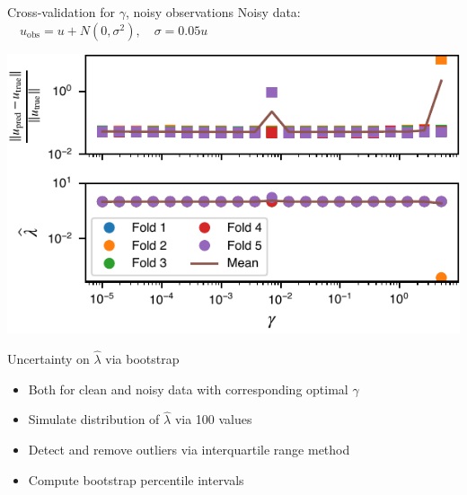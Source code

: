 \documentclass{beamer}
\begin{document}
\begin{frame}[label=current]{Cross-validation for $\gamma$, noisy observations}
\centering
Noisy data: $\quad u_{\text{obs}} = u +  N(0, \sigma^2), \quad \sigma=0.05u$

\vspace{0.5cm}
\includegraphics{images/heateq-cross_validation-noise}

\end{frame}

\begin{frame}{Uncertainty on $\widehat \lambda$ via bootstrap}
\begin{itemize}
    \item Both for clean and noisy data with corresponding optimal $\gamma$
    \item Simulate distribution of $\widehat \lambda$ via 100 values
    \item Detect and remove outliers via interquartile range method
    \item Compute bootstrap percentile intervals
\end{itemize}
\end{frame}
\end{document}
